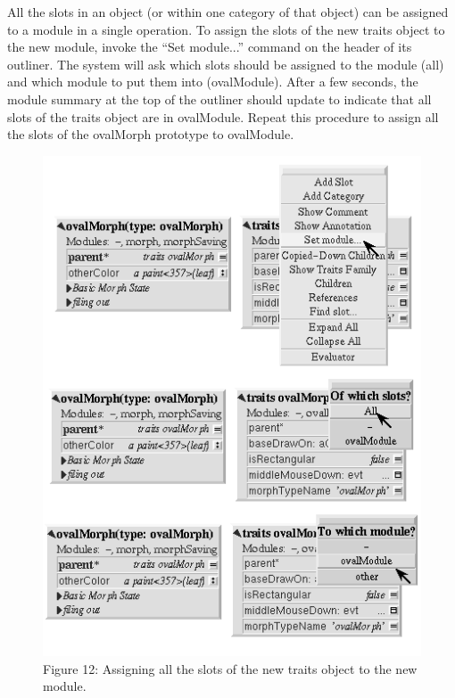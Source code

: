 \documentclass[letterpaper,10pt,english]{sphinxmanual}
\begin{document}
All the slots in an object (or within one category of that object) can be assigned to a module in a single operation. To assign the slots of the new traits object to the new module, invoke the ``Set module...'' command on the header of its outliner. The system will ask which slots should be assigned to the module (all) and which module to put them into (ovalModule). After a few seconds, the module summary at the top of the outliner should update to indicate that all slots of the traits object are in ovalModule. Repeat this procedure to assign all the slots of the ovalMorph prototype to ovalModule.
\begin{figure}[htbp]\begin{flushleft}
\capstart

\includegraphics{Figure12.png}
\caption{Figure 12: Assigning all the slots of the new traits object to the new module.}\end{flushleft}\end{figure}
\end{document}
